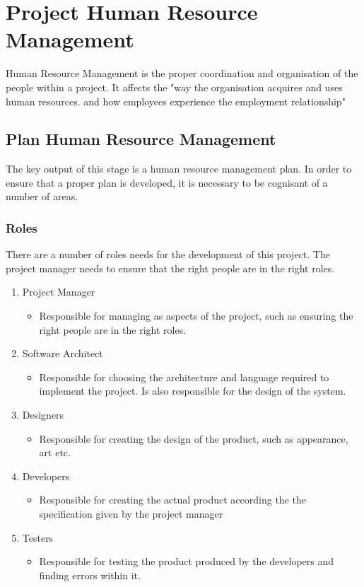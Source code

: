 \chapter{Project Human Resource Management}

Human Resource Management is the proper coordination and organisation of the people within a project. It affects the "way the organisation acquires and uses human resources. and how employees experience the employment relationship" \parencite{hr}

\section{Plan Human Resource Management}

The key output of this stage is a human resource management plan. In order to ensure that a proper plan is developed, it is necessary to be cognisant of a number of areas.

\subsection{Roles}

There are a number of roles needs for the development of this project. The project manager needs to ensure that the right people are in the right roles.

\begin{enumerate}
\item Project Manager
\begin{itemize}
\item Responsible for managing as aspects of the project, such as ensuring the right people are in the right roles.
\end{itemize}
\item Software Architect
\begin{itemize}
\item Responsible for choosing the architecture and language required to implement the project. Is also responsible for the design of the system.
\end{itemize}
\item Designers
\begin{itemize}
\item Responsible for creating the design of the product, such as appearance, art etc.
\end{itemize}
\item Developers
\begin{itemize}
\item Responsible for creating the actual product according the the specification given by the project manager
\end{itemize}
\item Testers
\begin{itemize}
\item Responsible for testing the product produced by the developers and finding errors within it.
\end{itemize}
\end{enumerate}

